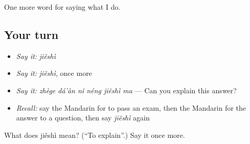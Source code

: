 \begin{grammarlens}[title={What you've built}]
One more word for saying what I do.
\end{grammarlens}

\subsection*{Your turn}
\begin{itemize}
\raggedright
  \item \emph{Say it:} \emph{jiěshì}
  \item \emph{Say it:} \emph{jiěshì}, once more
  \item \emph{Say it:} \emph{zhège dá'àn nǐ néng jiěshì ma} — Can you explain this answer?
  \item \emph{Recall:} say the Mandarin for to pass an exam, then the Mandarin for the answer to a question, then say \emph{jiěshì} again
\end{itemize}

\begin{tcolorbox}[breakable,colback=teal!4,colframe=teal!35!black,title={Before you move on}]
What does jiěshì mean? (\textquotedblleft{}To explain\textquotedblright{}.) Say it once more.
\end{tcolorbox}
